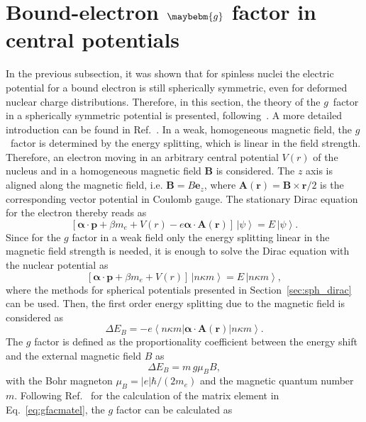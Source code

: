 \section{Bound-electron $\maybebm{g}$ factor in central potentials}
\label{sec:gfac_intro}
In the previous subsection, it was shown that for spinless nuclei the electric potential for a bound electron is still spherically symmetric, even for deformed nuclear charge distributions. Therefore, in this section, the theory of the $g$~factor in a spherically symmetric potential is presented, following~\cite{rose1961,Karshenboim2005}. A more detailed introduction can be found in Ref.~\cite{michel2015}. In a weak, homogeneous magnetic field, the $g$~factor is determined by the energy splitting, which is linear in the field strength. Therefore, an electron moving in an arbitrary central potential $V(r)$ of the nucleus and in a homogeneous magnetic field $\mathbf{B}$ is considered. The $z$ axis is aligned along the magnetic field, i.e. $\mathbf{B}=B\mathbf{e}_z$, where $\mathbf{A}(\mathbf{r})=\mathbf{B}\times \mathbf{r} /2$ is the corresponding vector potential in Coulomb gauge. The stationary Dirac equation for the electron thereby reads as
\begin{equation}
\left[\boldsymbol{\alpha}\cdot\mathbf{p}+\beta m_e + V(r) -e\boldsymbol{\alpha}\cdot\mathbf{A}(\mathbf{r})\right]\,\left|\psi\right> = E\,\left|\psi\right>.
\end{equation}
Since for the $g$ factor in a weak field only the energy splitting linear in the magnetic field strength is needed, it is enough to solve the Dirac equation with the nuclear potential as
\begin{equation}
\left[\boldsymbol{\alpha}\cdot\mathbf{p}+\beta m_e + V(r) \right]\,\left|n\kappa m\right> = E\,\left|n\kappa m\right>,
\end{equation}
where the methods for spherical potentials presented in Section~\ref{sec:sph_dirac} can be used. Then, the first order energy splitting due to the magnetic field is considered as
\begin{equation}
\Delta E_B = -e\left<n\kappa m\right|\boldsymbol{\alpha}\cdot\mathbf{A}(\mathbf{r})\left|n\kappa m\right>.
\label{eq:gfacmatel}
\end{equation}
The $g$ factor is defined as the proportionality coefficient between the energy shift and the external magnetic field $B$ as $$\Delta E_B = m\, g \mu_B B,$$
with the Bohr magneton $\mu_B=|e|\hbar/(2m_e)$ and the magnetic quantum number $m$.
Following Ref.~\cite{relativistic_electron_theory} for the calculation of the matrix element in Eq.~\eqref{eq:gfacmatel}, the $g$ factor can be calculated as
